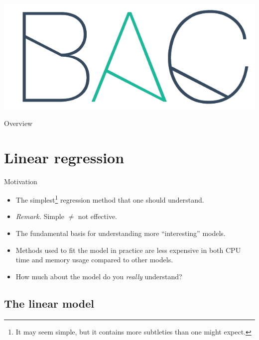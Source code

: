 \documentclass{beamer}
\title[\lecturetitle]{\lecturetitle}
\author[Derek Huang (BAC Advanced Team)]{Derek Huang}
\institute{BAC Advanced Team}
\date{April 10, 2021}
\numberwithin{equation}{section}
\begin{document}
\begin{frame}
    \titlepage
    \centering
    \includegraphics[scale = 0.1]{../bac_logo1.png}
\end{frame}

\begin{frame}{Overview}
    \tableofcontents
\end{frame}

\section{Linear regression}

\begin{frame}{Motivation}
    \begin{itemize}
        \item
        The simplest\footnote{
            It may seem simple, but it contains more subtleties than one
            might expect.
        } regression method that one should understand.

        \item
        \textit{Remark.} Simple $ \ne $ not effective.

        \item
        The fundamental basis for understanding more ``interesting'' models.

        \item
        Methods used to fit the model in practice are less expensive in both
        CPU time and memory usage compared to other models.

        \item
        How much about the model do you \textit{really} understand?
    \end{itemize}
\end{frame}

\subsection{The linear model}
\end{document}
